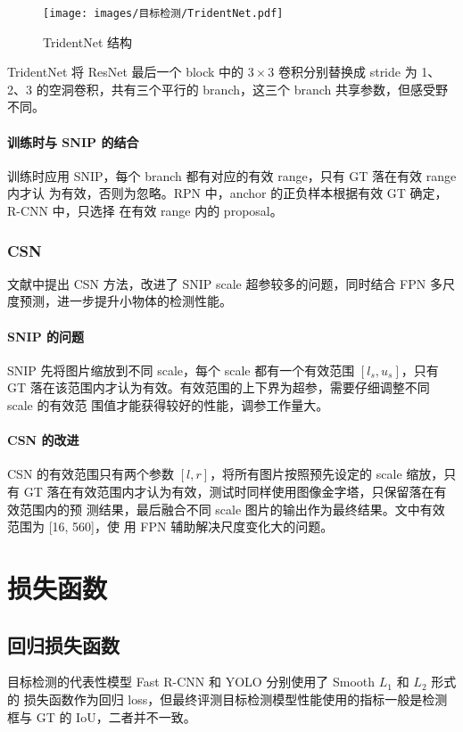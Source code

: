 \begin{figure}[ht]
  \centering
  \texttt{[image: images/目标检测/TridentNet.pdf]}
  \caption{TridentNet 结构}
  \label{fig:tridentnet}
\end{figure}

TridentNet 将 ResNet 最后一个 block 中的 $3 \times 3$ 卷积分别替换成 stride 为
1、2、3 的空洞卷积，共有三个平行的 branch，这三个 branch 共享参数，但感受野不同。

\paragraph{训练时与 SNIP 的结合}
训练时应用 SNIP，每个 branch 都有对应的有效 range，只有 GT 落在有效 range 内才认
为有效，否则为忽略。RPN 中，anchor 的正负样本根据有效 GT 确定，R-CNN 中，只选择
在有效 range 内的 proposal。

\subsubsection{CSN}
文献中提出 CSN 方法，改进了 SNIP scale 超参较多的问题，同时结合
FPN 多尺度预测，进一步提升小物体的检测性能。 

\paragraph{SNIP 的问题}
SNIP 先将图片缩放到不同 scale，每个 scale 都有一个有效范围 $[l_s, u_s]$，只有 GT
落在该范围内才认为有效。有效范围的上下界为超参，需要仔细调整不同 scale 的有效范
围值才能获得较好的性能，调参工作量大。

\paragraph{CSN 的改进}
CSN 的有效范围只有两个参数 $[l, r]$，将所有图片按照预先设定的 scale 缩放，只有
GT 落在有效范围内才认为有效，测试时同样使用图像金字塔，只保留落在有效范围内的预
测结果，最后融合不同 scale 图片的输出作为最终结果。文中有效范围为 [16, 560]，使
用 FPN 辅助解决尺度变化大的问题。

\section{损失函数}
\subsection{回归损失函数}
目标检测的代表性模型 Fast R-CNN 和 YOLO 分别使用了 Smooth $L_1$ 和 $L_2$ 形式的
损失函数作为回归 loss，但最终评测目标检测模型性能使用的指标一般是检测框与 GT 的
IoU，二者并不一致。

